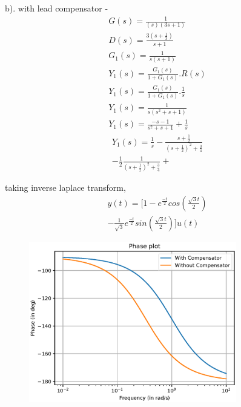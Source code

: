 \begin{enumerate}[label=\thesection.\arabic*.,ref=\thesection.\theenumi]
b). with lead compensator - 
\begin{align}
G(s) = \frac{1}{(s)(3s+1)}\\
D(s) = \frac{3(s+\frac{1}{3})}{s+1} \\
G_{1}(s) = \frac{1}{s(s+1)}\\
Y_{1}(s) =\frac{G_{1}(s)}{1+G_{1}(s)}.R(s)\\
Y_{1}(s) =\frac{G_{1}(s)}{1+G_{1}(s)}.\frac{1}{s}\\
Y_{1}(s) = \frac{1}{s(s^2+s+1)}\\
Y_{1}(s) = \frac{-s-1}{s^2+s+1} + \frac{1}{s}
\end{align}
\begin{equation}
    \begin{split}
        Y_{1}(s) =  \frac{1}{s} - \frac{s+\frac{1}{2}}{(s+\frac{1}{2})^2+\frac{3}{4}}\\ - \frac{1}{2}\frac{1}{(s+\frac{1}{2})^2+\frac{3}{4}} + 
    \end{split}
\end{equation}

taking inverse laplace transform, 
\begin{equation}
    \begin{split}
        y(t) = [1 - e^{\frac{-t}{2}}cos(\frac{\sqrt{3}t}{2})\\- \frac{1}{\sqrt{3}}e^{\frac{-t}{2}}sin(\frac{\sqrt{3}t}{2}) ]u(t)
    \end{split}
\end{equation}


\begin{figure}
\includegraphics[width=1\linewidth, height=7cm ,inner]{./figs/ee18btech11027/lead_compensator_phase.eps} 
\label{fig:subim1}
\end{figure}



\end{enumerate}
